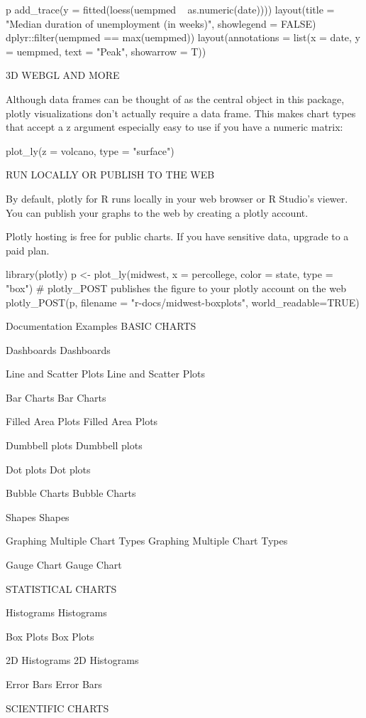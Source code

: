 p %
  add_trace(y = fitted(loess(uempmed ~ as.numeric(date)))) %
  layout(title = "Median duration of unemployment (in weeks)",
         showlegend = FALSE) %
  dplyr::filter(uempmed == max(uempmed)) %
  layout(annotations = list(x = date, y = uempmed, text = "Peak", showarrow = T))

3D WEBGL AND MORE

Although data frames can be thought of as the central object in this package, plotly visualizations don't actually require a data frame. This makes chart types that accept a z argument especially easy to use if you have a numeric matrix:

plot_ly(z = volcano, type = "surface")

RUN LOCALLY OR PUBLISH TO THE WEB

By default, plotly for R runs locally in your web browser or R Studio's viewer. You can publish your graphs to the web by creating a plotly account.

Plotly hosting is free for public charts. If you have sensitive data, upgrade to a paid plan.

library(plotly)
p <- plot_ly(midwest, x = percollege, color = state, type = "box")
# plotly_POST publishes the figure to your plotly account on the web
plotly_POST(p, filename = "r-docs/midwest-boxplots", world_readable=TRUE)

Documentation Examples
BASIC CHARTS


 Dashboards
Dashboards


 Line and Scatter Plots
Line and Scatter Plots


 Bar Charts
Bar Charts


 Filled Area Plots
Filled Area Plots


 Dumbbell plots
Dumbbell plots


 Dot plots
Dot plots


 Bubble Charts
Bubble Charts


 Shapes
Shapes


 Graphing Multiple Chart Types
Graphing Multiple Chart Types


 Gauge Chart
Gauge Chart

STATISTICAL CHARTS


 Histograms
Histograms


 Box Plots
Box Plots


 2D Histograms
2D Histograms


 Error Bars
Error Bars

SCIENTIFIC CHARTS


